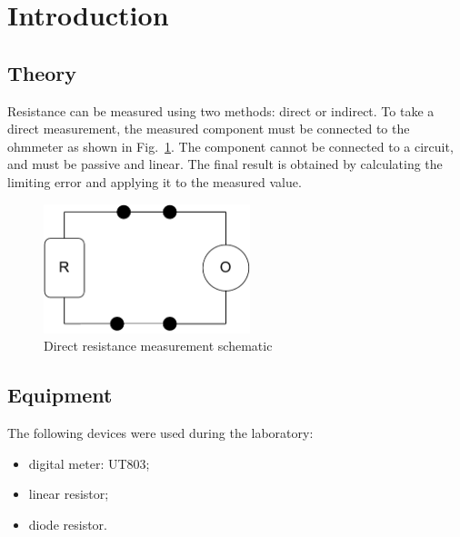 \section{Introduction}

\subsection{Theory}

Resistance can be measured using two methods: direct or indirect. To take a direct measurement, the measured component must be connected to the ohmmeter as shown in Fig.~\ref{fig:direct_schematic}. The component cannot be connected to a circuit, and must be passive and linear. The final result is obtained by calculating the limiting error and applying it to the measured value.

\begin{figure}[H]
	\centering
	\includegraphics[width=6cm]{schematics/direct.pdf}
	\caption{Direct resistance measurement schematic}
	\label{fig:direct_schematic}
\end{figure}

\subsection{Equipment}

The following devices were used during the laboratory:

\begin{itemize}
	\item digital meter: UT803;
	\item linear resistor;
	\item diode resistor.
\end{itemize}